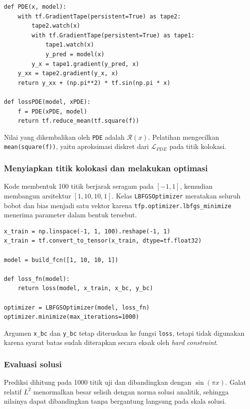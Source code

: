 \documentclass[12pt, letterpaper]{article}
\begin{document}
\begin{lstlisting}[caption={Residual Poisson dan loss PDE}]
def PDE(x, model):
    with tf.GradientTape(persistent=True) as tape2:
        tape2.watch(x)
        with tf.GradientTape(persistent=True) as tape1:
            tape1.watch(x)
            y_pred = model(x)
        y_x = tape1.gradient(y_pred, x)
    y_xx = tape2.gradient(y_x, x)
    return y_xx + (np.pi**2) * tf.sin(np.pi * x)

def lossPDE(model, xPDE):
    f = PDE(xPDE, model)
    return tf.reduce_mean(tf.square(f))
\end{lstlisting}

Nilai yang dikembalikan oleh \texttt{PDE} adalah $\mathcal{R}(x)$. Pelatihan
mengecilkan \texttt{mean(square(f))}, yaitu aproksimasi diskret dari
$\mathcal{L}_{PDE}$ pada titik kolokasi.

\subsubsection{Menyiapkan titik kolokasi dan melakukan optimasi}

Kode membentuk 100 titik berjarak seragam pada $[-1,1]$, kemudian membangun
arsitektur $[1,10,10,1]$. Kelas \texttt{LBFGSOptimizer} meratakan seluruh bobot
dan bias menjadi satu vektor karena \texttt{tfp.optimizer.lbfgs\_minimize}
menerima parameter dalam bentuk tersebut.

\begin{lstlisting}[caption={Titik kolokasi dan pelatihan Poisson}]
x_train = np.linspace(-1, 1, 100).reshape(-1, 1)
x_train = tf.convert_to_tensor(x_train, dtype=tf.float32)

model = build_fcn([1, 10, 10, 1])

def loss_fn(model):
    return loss(model, x_train, x_bc, y_bc)

optimizer = LBFGSOptimizer(model, loss_fn)
optimizer.minimize(max_iterations=1000)
\end{lstlisting}

Argumen \texttt{x\_bc} dan \texttt{y\_bc} tetap diteruskan ke fungsi
\texttt{loss}, tetapi tidak digunakan karena syarat batas sudah diterapkan
secara eksak oleh \textit{hard constraint}.

\subsubsection{Evaluasi solusi}

Prediksi dihitung pada 1000 titik uji dan dibandingkan dengan
$\sin(\pi x)$. Galat relatif $L^2$ menormalkan besar selisih dengan norma
solusi analitik, sehingga nilainya dapat dibandingkan tanpa bergantung langsung
pada skala solusi.
\end{document}
